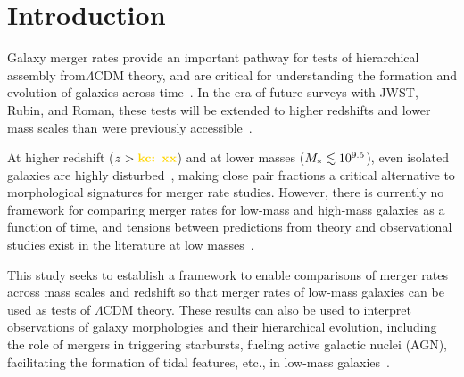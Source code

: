 \documentclass[twocolumn,linenumbers]{aastex631}
\newcommand{\kc}[1]{\textcolor{yellow}{\textbf{kc: #1}} }
\begin{document}


\section{Introduction} \label{sec:intro}
Galaxy merger rates provide an important pathway for tests of hierarchical assembly from$\Lambda$CDM theory, and are critical for understanding the formation and evolution of galaxies across time~\citep[e.g.][]{Stewart2009, Hopkins2010b,RG2015}. 
In the era of future surveys with JWST, Rubin, and Roman, these tests will be extended to higher redshifts and lower mass scales than were previously accessible~\citep{Gardner2006,Spergel2015,Robertson2019a,Robertson2019b,Behroozi2020,Martin2022}.  

At higher redshift ($z>\kc{xx}$) and at lower masses ($M_{*{}} \lesssim10^{9.5}$), even isolated galaxies are highly disturbed~\citep{Wuyts2013,Martin2018,RG2019,Martin2021}, making close pair fractions a critical alternative to morphological signatures for merger rate studies.
However, there is currently no framework for comparing merger rates for low-mass and high-mass galaxies as a function of time, and tensions between predictions from theory and observational studies exist in the literature at low masses~\citep[see e.g. Fig.~10 in][]{RG2015}. 

This study seeks to establish a framework to enable comparisons of merger rates across mass scales and redshift so that merger rates of low-mass galaxies can be used as tests of $\Lambda$CDM theory. 
These results can also be used to interpret observations of galaxy morphologies and their hierarchical evolution, including the role of mergers in triggering starbursts, fueling active galactic nuclei (AGN), facilitating the formation of tidal features, etc., in low-mass galaxies~\citep[e.g.][]{Stierwalt2015,Pearson2016,Privon2017,Kristensen2021,Martin2021,Luber2022,Martin2022,GuzmanOrtega2023,ByrneMamahit2024,KadoFong2024}. 



\end{document}
